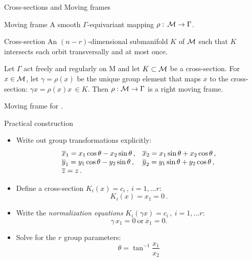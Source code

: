 \documentclass{beamer}
\begin{document}
\begin{frame}{Cross-sections and Moving frames}

\begin{block}{Moving frame}
 A smooth $\Gamma$-equivariant mapping $\rho:\,\mathcal{M} \rightarrow \Gamma$.
\end{block}

\begin{block}{Cross-section}
 An $(n-r)$-dimensional submanifold $K$ of $\mathcal{M}$ such that $K$ intersects each orbit transversally and at most once.
\end{block}

\begin{block}{}
Let $\Gamma$ act freely and regularly on M and let $K\subset\mathcal{M}$ be a cross-section.
For $x\in \mathcal{M}$, let $\gamma=\rho(x)$ be the unique group element that maps $x$ to the
cross-section: $\gamma x = \rho(x) x\, \in K$. Then $\rho:\mathcal{M}\rightarrow \Gamma$ is a right moving frame.
\end{block}

\end{frame}

\begin{frame}{Moving frame for \CLe.}

\begin{block}{Practical construction}
 \begin{itemize}
  \item Write out group transformations explicitly:
	\negvsp\[
		\begin{array}{ll}
		\overline{x}_1 = x_1 \cos\theta - x_2 \sin\theta\,, &
		\overline{x}_2 = x_1 \sin\theta + x_2 \cos\theta\,, \\ 
		\overline{y}_1 = y_1 \cos\theta - y_2 \sin\theta\,, &
		\overline{y}_2 = y_1 \sin\theta + y_2 \cos\theta\,, \\ 	
		\overline{z} = z\,.
		\end{array}
	\]
  \item \negvsp Define a cross-section $K_i(x)=c_i\,,\ i=1,\ldots r$:
	\negvsp\[
	 	K_i(x)=x_1=0\,.
	\]
  \item \negvsp Write the \emph{normalization equations} $K_i(\gamma x)=c_i\,,\ i=1,\ldots r$:
	\negvsp\[
		\gamma\, x_1=0\ \mathrm{or}\ \overline{x}_1=0.	 
	\]
  \item \negvsp Solve for the $r$ group parameters:
	\negvsp\[
	 	\theta=\tan^{-1}\frac{x_1}{x_2}
	\]

 \end{itemize}

\end{block}

\end{frame}
\end{document}
